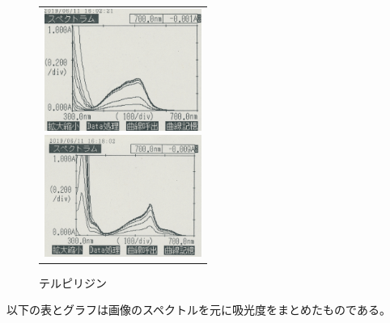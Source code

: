 \documentclass[a4paper,papersize,dvipdfmx]{jsarticle}
\begin{document}
\begin{figure}[H]
\begin{center}
\begin{tabular}{c}

\begin{minipage}{0.22\hsize}
\begin{center}
\includegraphics[clip, height=4cm]{imgs/Phe.jpg}
\caption{フェナントロリン}
\end{center}
\end{minipage}

\begin{minipage}{0.10\hsize}
\hspace{10mm}
\end{minipage}

\begin{minipage}{0.22\hsize}
\begin{center}
\includegraphics[clip, height=4cm]{imgs/Ter.jpg}
\caption{テルピリジン}
\end{center}
\end{minipage}

\end{tabular}
\end{center}
\end{figure}


以下の表とグラフは画像のスペクトルを元に吸光度をまとめたものである。
\end{document}
